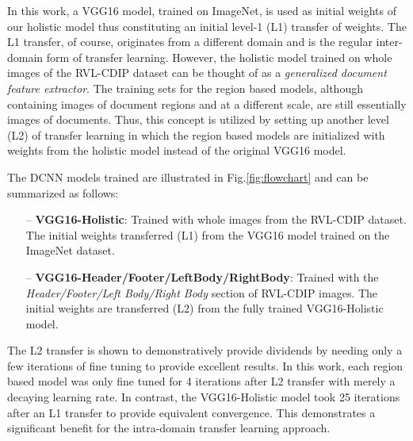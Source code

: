 \documentclass[10pt,conference,a4paper]{IEEEtran}
\begin{document}
In this work, a VGG16 model, trained on ImageNet, is used as initial weights of our holistic model thus constituting an initial level-1 (L1) transfer of weights. The L1 transfer, of course, originates from a different domain and is the regular inter-domain form of transfer learning. However, the holistic model trained on whole images of the RVL-CDIP dataset can be thought of as a \textit{generalized document feature extractor}. The training sets for the region based models, although containing images of document regions and at a different scale, are still essentially images of documents. Thus, this concept is utilized by setting up another level (L2) of transfer learning in which the region based models are initialized with weights from the holistic model instead of the original VGG16 model.


The DCNN models trained are illustrated in Fig.\ref{fig:flowchart} and can be summarized as follows:


\begin{itemize}
\item[--] \textbf{VGG16-Holistic}: Trained with whole images from the RVL-CDIP dataset. The initial weights transferred (L1) from the VGG16 model trained on the ImageNet dataset.
 	
\item[--] \textbf{VGG16-Header/Footer/LeftBody/RightBody}: Trained with the \textit{Header/Footer/Left Body/Right Body} section of RVL-CDIP images. The initial weights are transferred (L2) from the fully trained VGG16-Holistic model.
\end{itemize}


The L2 transfer is shown to demonstratively provide dividends by needing only a few iterations of fine tuning to provide excellent results. In this work, each region based model was only fine tuned for 4 iterations after L2 transfer with merely a decaying learning rate. In contrast, the VGG16-Holistic model took 25 iterations after an L1 transfer to provide equivalent convergence. This demonstrates a significant benefit for the intra-domain transfer learning approach.
\end{document}
